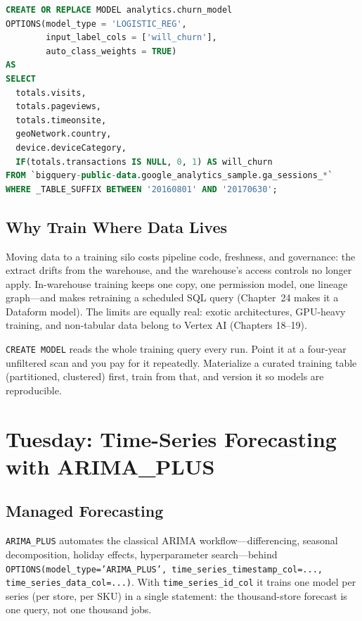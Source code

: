 \begin{lstlisting}[language=SQL,caption={Training a churn classifier in pure SQL.}]
CREATE OR REPLACE MODEL analytics.churn_model
OPTIONS(model_type = 'LOGISTIC_REG',
        input_label_cols = ['will_churn'],
        auto_class_weights = TRUE)
AS
SELECT
  totals.visits,
  totals.pageviews,
  totals.timeonsite,
  geoNetwork.country,
  device.deviceCategory,
  IF(totals.transactions IS NULL, 0, 1) AS will_churn
FROM `bigquery-public-data.google_analytics_sample.ga_sessions_*`
WHERE _TABLE_SUFFIX BETWEEN '20160801' AND '20170630';
\end{lstlisting}

\subsection{Why Train Where Data Lives}
Moving data to a training silo costs pipeline code, freshness, and governance: the extract drifts from the warehouse, and the warehouse's access controls no longer apply. In-warehouse training keeps one copy, one permission model, one lineage graph---and makes retraining a scheduled SQL query (Chapter~24 makes it a Dataform model). The limits are equally real: exotic architectures, GPU-heavy training, and non-tabular data belong to Vertex AI (Chapters 18--19).

\begin{pitfall}
\texttt{CREATE MODEL} reads the whole training query every run. Point it at a four-year unfiltered scan and you pay for it repeatedly. Materialize a curated training table (partitioned, clustered) first, train from that, and version it so models are reproducible.
\end{pitfall}

\section{Tuesday: Time-Series Forecasting with ARIMA\_PLUS}

\subsection{Managed Forecasting}
\texttt{ARIMA\_PLUS} automates the classical ARIMA workflow---differencing, seasonal decomposition, holiday effects, hyperparameter search---behind \texttt{OPTIONS(model\_type='ARIMA\_PLUS', time\_series\_timestamp\_col=..., time\_series\_data\_col=...)}. With \texttt{time\_series\_id\_col} it trains one model per series (per store, per SKU) in a single statement: the thousand-store forecast is one query, not one thousand jobs.

